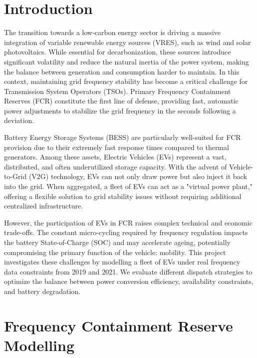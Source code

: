 \documentclass{article}
\begin{document}
\clearpage
\tableofcontents
\clearpage

\twocolumn

\section{Introduction}
The transition towards a low-carbon energy sector is driving a massive integration of variable renewable energy sources (VRES), such as wind and solar photovoltaics. While essential for decarbonization, these sources introduce significant volatility and reduce the natural inertia of the power system, making the balance between generation and consumption harder to maintain. In this context, maintaining grid frequency stability has become a critical challenge for Transmission System Operators (TSOs). Primary Frequency Containment Reserves (FCR) constitute the first line of defense, providing fast, automatic power adjustments to stabilize the grid frequency in the seconds following a deviation.

Battery Energy Storage Systems (BESS) are particularly well-suited for FCR provision due to their extremely fast response times compared to thermal generators. Among these assets, Electric Vehicles (EVs) represent a vast, distributed, and often underutilized storage capacity. With the advent of Vehicle-to-Grid (V2G) technology, EVs can not only draw power but also inject it back into the grid. When aggregated, a fleet of EVs can act as a "virtual power plant," offering a flexible solution to grid stability issues without requiring additional centralized infrastructure.

However, the participation of EVs in FCR raises complex technical and economic trade-offs. The constant micro-cycling required by frequency regulation impacts the battery State-of-Charge (SOC) and may accelerate ageing, potentially compromising the primary function of the vehicle: mobility. This project investigates these challenges by modelling a fleet of EVs under real frequency data constraints from 2019 and 2021. We evaluate different dispatch strategies to optimize the balance between power conversion efficiency, availability constraints, and battery degradation.

\section{Frequency Containment Reserve Modelling}
\end{document}
